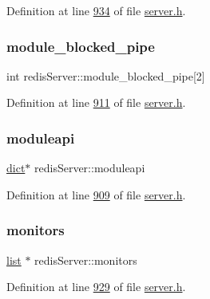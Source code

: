 Definition at line \hyperlink{server_8h_source_l00934}{934} of file \hyperlink{server_8h_source}{server.\+h}.

\mbox{\label{structredisServer_aa24b12fbf7d5a173476779e650df1351}} 
\subsubsection{\texorpdfstring{module\+\_\+blocked\+\_\+pipe}{module\_blocked\_pipe}}
{\footnotesize\ttfamily int redis\+Server\+::module\+\_\+blocked\+\_\+pipe\mbox{[}2\mbox{]}}



Definition at line \hyperlink{server_8h_source_l00911}{911} of file \hyperlink{server_8h_source}{server.\+h}.

\mbox{\label{structredisServer_aaee68f19a67895439d4f00a09a1a3a5b}} 
\subsubsection{\texorpdfstring{moduleapi}{moduleapi}}
{\footnotesize\ttfamily \hyperlink{structdict}{dict}$\ast$ redis\+Server\+::moduleapi}



Definition at line \hyperlink{server_8h_source_l00909}{909} of file \hyperlink{server_8h_source}{server.\+h}.

\mbox{\label{structredisServer_a98ecd375212979d86d3c4fc4c6aaf251}} 
\subsubsection{\texorpdfstring{monitors}{monitors}}
{\footnotesize\ttfamily \hyperlink{structlist}{list} $\ast$ redis\+Server\+::monitors}



Definition at line \hyperlink{server_8h_source_l00929}{929} of file \hyperlink{server_8h_source}{server.\+h}.

